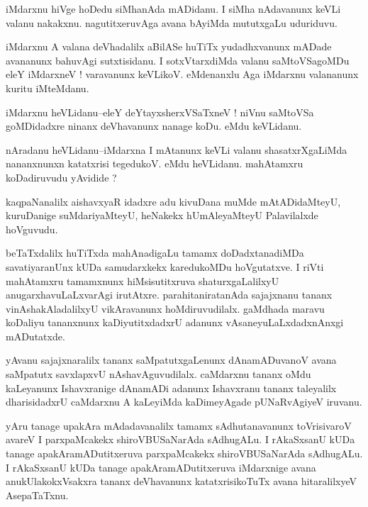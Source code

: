 \documentclass{article}
\begin{document}
\begin{mn}%
iMdarxnu hiVge hoDedu siMhanAda mADidanu. I siMha nAdavanunx keVLi valanu nakakxnu. 
nagutitxeruvAga avana bAyiMda mututxgaLu uduriduvu.
\end{mn}

\begin{mn}%
iMdarxnu A valana deVhadalilx aBilASe huTiTx yudadhxvanunx mADade avananunx bahuvAgi 
sutxtisidanu. I sotxVtarxdiMda valanu saMtoVSagoMDu eleY iMdarxneV ! varavanunx keVLikoV. 
eMdenanxlu Aga iMdarxnu valananunx kuritu iMteMdanu.
\end{mn}

\begin{mn}%
iMdarxnu heVLidanu--eleY deYtayxsherxVSaTxneV ! niVnu saMtoVSa goMDidadxre ninanx 
deVhavanunx nanage koDu. eMdu keVLidanu.
\end{mn}

\begin{mn}%
nAradanu heVLidanu--iMdarxna I mAtanunx keVLi valanu shasatxrXgaLiMda nananxnunxn katatxrisi 
tegedukoV. eMdu heVLidanu. mahAtamxru koDadiruvudu yAvidide ?
\end{mn}

\begin{mn}%
kaqpaNanalilx aishavxyaR idadxre adu kivuDana muMde mAtADidaMteyU, kuruDanige suMdariyaMteyU, 
heNakekx hUmAleyaMteyU Palavilalxde hoVguvudu.
\end{mn}

\begin{mn}%
beTaTxdalilx huTiTxda mahAnadigaLu tamamx doDadxtanadiMDa savatiyaranUnx kUDa samudarxkekx 
karedukoMDu hoVgutatxve. I riVti mahAtamxru tamamxnunx hiMsisutitxruva shaturxgaLalilxyU 
anugarxhavuLaLxvarAgi irutAtxre. parahitaniratanAda sajajxnanu tananx vinAshakAladalilxyU 
vikAravanunx hoMdiruvudilalx. gaMdhada maravu koDaliyu tananxnunx kaDiyutitxdadxrU adanunx 
vAsaneyuLaLxdadxnAnxgi mADutatxde.
\end{mn}

\begin{mn}%
yAvanu sajajxnaralilx tananx saMpatutxgaLenunx dAnamADuvanoV avana saMpatutx savxlapxvU 
nAshavAguvudilalx. caMdarxnu tananx oMdu kaLeyanunx Ishavxranige dAnamADi adanunx 
Ishavxranu tananx taleyalilx dharisidadxrU caMdarxnu A kaLeyiMda kaDimeyAgade pUNaRvAgiyeV 
iruvanu.
\end{mn}

\begin{mn}%
yAru tanage upakAra mAdadavanalilx tamamx sAdhutanavanunx toVrisivaroV avareV I 
parxpaMcakekx shiroVBUSaNarAda sAdhugALu. I rAkaSxsanU kUDa tanage apakAramADutitxeruva 
parxpaMcakekx shiroVBUSaNarAda sAdhugALu. I rAkaSxsanU kUDa tanage apakAramADutitxeruva 
iMdarxnige avana anukUlakokxVsakxra tananx deVhavanunx katatxrisikoTuTx avana hitaralilxyeV 
AsepaTaTxnu.
\end{mn}
\end{document}
